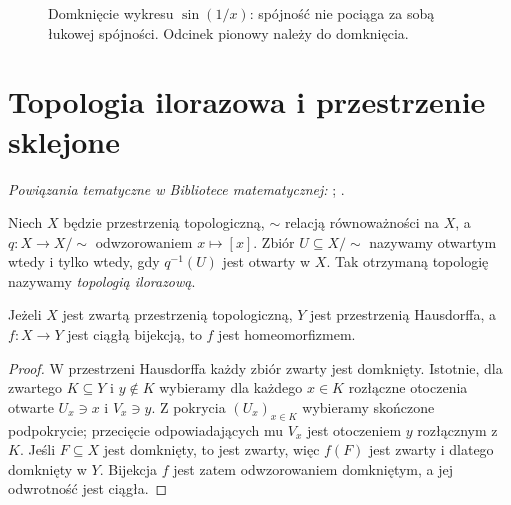 \begin{figure}[H]
\centering
{}
\caption{Domknięcie wykresu $\sin(1/x)$: spójność nie pociąga
za sobą łukowej spójności. Odcinek pionowy należy do domknięcia.}
\label{fig:sinus-topologa-top-intro}
\end{figure}

\section{Topologia ilorazowa i przestrzenie sklejone}

\noindent\emph{Powiązania tematyczne w Bibliotece matematycznej:} ; .


\begin{definicja}
\label{def:topologia-ilorazowa}
Niech $X$ będzie przestrzenią topologiczną, $\sim$ relacją
równoważności na $X$, a $q:X\to X/{\sim}$ odwzorowaniem
$x\mapsto[x]$.
Zbiór $U\subseteq X/{\sim}$ nazywamy otwartym wtedy i tylko wtedy, gdy
$q^{-1}(U)$ jest otwarty w $X$. Tak otrzymaną topologię nazywamy
\emph{topologią ilorazową}.
\end{definicja}

\begin{lemat}
\label{lem:zwarta-hausdorff-top-intro}
Jeżeli $X$ jest zwartą przestrzenią topologiczną, $Y$ jest
przestrzenią Hausdorffa, a $f:X\to Y$ jest ciągłą bijekcją,
to $f$ jest homeomorfizmem.
\end{lemat}
\begin{proof}
W przestrzeni Hausdorffa każdy zbiór zwarty jest domknięty.
Istotnie, dla zwartego $K\subseteq Y$ i $y\notin K$
wybieramy dla każdego $x\in K$ rozłączne otoczenia
otwarte $U_x\ni x$ i $V_x\ni y$. Z pokrycia $(U_x)_{x\in K}$
wybieramy skończone podpokrycie; przecięcie odpowiadających
mu $V_x$ jest otoczeniem $y$ rozłącznym z $K$.
Jeśli $F\subseteq X$ jest domknięty, to jest zwarty,
więc $f(F)$ jest zwarty i dlatego domknięty w $Y$.
Bijekcja $f$ jest zatem odwzorowaniem domkniętym, a jej
odwrotność jest ciągła.
\end{proof}

